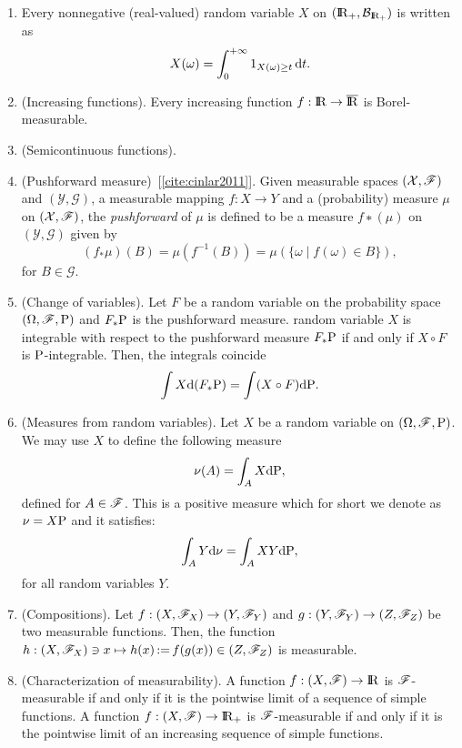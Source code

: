 \documentclass[a4paper,10pt]{article}
\begin{document}
\begin{enumerate}
 \item \label{rv221030}
      Every nonnegative (real-valued) random variable $X$ on $(\Re_+, \B_{{\Re}_+})$ 
      is written as 
      \[
        X(\omega) = \int_0^{+\infty} 1_{X(\omega)\geq t}\,\mathrm{d} t.
      \]

 \item (Increasing functions).  Every increasing function $f:\Re\to\barre$ is Borel-measurable.
 
 \item (Semicontinuous functions). 
 \item (Pushforward measure)~[\ref{cite:cinlar2011}]. Given measurable spaces $(\mathcal{X},\mathscr{F})$ and $(\mathcal{Y}, \mathcal{G})$, 
 a measurable mapping $f: X \to Y$ and a (probability) measure $\mu$ on $(\mathcal{X},\mathscr{F})$, the \textit{pushforward} of $\mu$
 is defined to be a measure $f∗(\mu)$ on $(\mathcal{Y}, \mathcal{G})$ given by
 \[
  (f_*\mu)(B) = \mu(f^{-1}(B)) = \mu(\{\omega\mid f(\omega)\in B\}),
 \]
 for $B\in\mathcal{G}$.
 \item (Change of variables). Let $F$ be a random variable on the probability space $(\Omega,\mathscr{F},\mathrm{P})$ and $F_*\mathrm{P}$ 
 is the pushforward measure. random variable $X$ is integrable with respect to the pushforward measure $F_*\mathrm{P}$
 if and only if $X\circ F$ is $\mathrm{P}$-integrable. Then, the integrals coincide
 \[
  \int X \mathrm{d}(F_*\mathrm{P}) = \int (X\circ F) \mathrm{d} \mathrm{P}.
 \]
 \item (Measures from random variables). Let $X$ be a random variable on $(\Omega,\mathscr{F},\mathrm{P})$. 
       We may use $X$ to define the following measure
       \[
        \nu(A) = \int_A X\mathrm{d} \mathrm{P},
       \]
       defined for $A\in\mathscr{F}$. This is a positive measure which for short we denote as $\nu=X\mathrm{P}$
       and it satisfies:
       \[
        \int_A Y\mathrm{d} \nu = \int_A XY\mathrm{d} \mathrm{P},
       \]
       for all random variables $Y$.
       
 \item (Compositions). Let $f:(X,\mathscr{F}_X)\to (Y, \mathscr{F}_Y)$ and $g:(Y,\mathscr{F}_Y)\to (Z,\mathscr{F}_Z)$ be two measurable functions. 
       Then, the function $h:(X,\mathscr{F}_X)\ni x\mapsto h(x) {}\mathop{\mathrel{:}=}{} f(g(x)) \in (Z,\mathscr{F}_Z)$ is measurable. 
       
 \item (Characterization of measurability). A function $f:(X,\F)\to\Re$ is $\mathscr{F}$-measurable if and only if 
       it is the pointwise limit of a sequence of simple functions. A function $f:(X,\F)\to\Re_+$ is 
       $\mathscr{F}$-measurable if and only if  it is the pointwise limit of an increasing sequence of simple functions. 
       

\end{enumerate}
\end{document}
